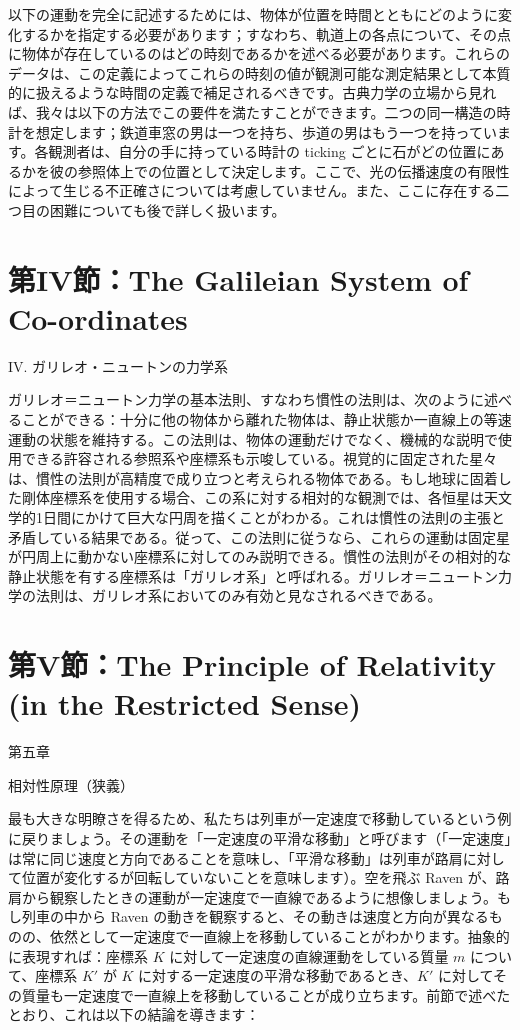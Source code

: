 \documentclass[a4paper,11pt,openany]{ltjsbook}
\begin{document}
以下の運動を完全に記述するためには、物体が位置を時間とともにどのように変化するかを指定する必要があります；すなわち、軌道上の各点について、その点に物体が存在しているのはどの時刻であるかを述べる必要があります。これらのデータは、この定義によってこれらの時刻の値が観測可能な測定結果として本質的に扱えるような時間の定義で補足されるべきです。古典力学の立場から見れば、我々は以下の方法でこの要件を満たすことができます。二つの同一構造の時計を想定します；鉄道車窓の男は一つを持ち、歩道の男はもう一つを持っています。各観測者は、自分の手に持っている時計の ticking ごとに石がどの位置にあるかを彼の参照体上での位置として決定します。ここで、光の伝播速度の有限性によって生じる不正確さについては考慮していません。また、ここに存在する二つ目の困難についても後で詳しく扱います。


\clearpage
\chapter{第IV節：The Galileian System of Co-ordinates}

IV. ガリレオ・ニュートンの力学系

ガリレオ＝ニュートン力学の基本法則、すなわち慣性の法則は、次のように述べることができる：十分に他の物体から離れた物体は、静止状態か一直線上の等速運動の状態を維持する。この法則は、物体の運動だけでなく、機械的な説明で使用できる許容される参照系や座標系も示唆している。視覚的に固定された星々は、慣性の法則が高精度で成り立つと考えられる物体である。もし地球に固着した剛体座標系を使用する場合、この系に対する相対的な観測では、各恒星は天文学的1日間にかけて巨大な円周を描くことがわかる。これは慣性の法則の主張と矛盾している結果である。従って、この法則に従うなら、これらの運動は固定星が円周上に動かない座標系に対してのみ説明できる。慣性の法則がその相対的な静止状態を有する座標系は「ガリレオ系」と呼ばれる。ガリレオ＝ニュートン力学の法則は、ガリレオ系においてのみ有効と見なされるべきである。


\clearpage
\chapter{第V節：The Principle of Relativity (in the Restricted Sense)}

第五章

相対性原理（狭義）

最も大きな明瞭さを得るため、私たちは列車が一定速度で移動しているという例に戻りましょう。その運動を「一定速度の平滑な移動」と呼びます（「一定速度」は常に同じ速度と方向であることを意味し、「平滑な移動」は列車が路肩に対して位置が変化するが回転していないことを意味します）。空を飛ぶ Raven が、路肩から観察したときの運動が一定速度で一直線であるように想像しましょう。もし列車の中から Raven の動きを観察すると、その動きは速度と方向が異なるものの、依然として一定速度で一直線上を移動していることがわかります。抽象的に表現すれば：座標系 $K$ に対して一定速度の直線運動をしている質量 $m$ について、座標系 $K′$ が $K$ に対する一定速度の平滑な移動であるとき、$K′$ に対してその質量も一定速度で一直線上を移動していることが成り立ちます。前節で述べたとおり、これは以下の結論を導きます：
\end{document}
